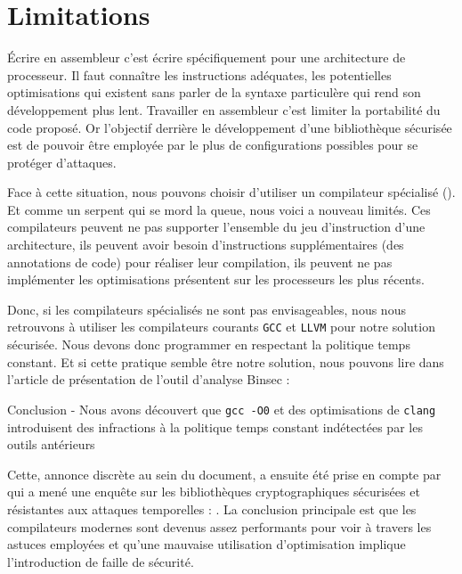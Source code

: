 \section{Limitations}
\label{sect:limitations}

Écrire en assembleur c'est écrire spécifiquement pour une architecture de processeur. Il faut connaître les instructions adéquates, les potentielles optimisations qui existent sans parler de la syntaxe particulère qui rend son développement plus lent. Travailler en assembleur c'est limiter la portabilité du code proposé. Or l'objectif derrière le développement d'une bibliothèque sécurisée est de pouvoir être employée par le plus de configurations possibles pour se protéger d'attaques.\smallbreak

Face à cette situation, nous pouvons choisir d'utiliser un compilateur spécialisé (\cite{Borrello_2021, Raccoon}). Et comme un serpent qui se mord la queue, nous voici a nouveau limités. Ces compilateurs peuvent ne pas supporter l'ensemble du jeu d'instruction d'une architecture, ils peuvent avoir besoin d'instructions supplémentaires (des annotations de code) pour réaliser leur compilation, ils peuvent ne pas implémenter les optimisations présentent sur les processeurs les plus récents.\smallbreak

Donc, si les compilateurs spécialisés ne sont pas envisageables, nous nous retrouvons à utiliser les compilateurs courants \texttt{GCC} et \texttt{LLVM} pour notre solution sécurisée. Nous devons donc programmer en respectant la politique temps constant. Et si cette pratique semble être notre solution, nous pouvons lire dans l'article de présentation de l'outil d'analyse Binsec  : 
\begin{CitationBox}{Conclusion - \cite{binsecRel2019}}
Nous avons découvert que \texttt{gcc -O0} et des optimisations de \texttt{clang} introduisent des infractions à la politique temps constant indétectées par les outils antérieurs
\end{CitationBox}\smallbreak

Cette, annonce discrète au sein du document, a ensuite été prise en compte par \citeauthor{schneider2024breakingbadcompilersbreak} qui a mené une enquête sur les bibliothèques cryptographiques sécurisées et résistantes aux attaques temporelles : \cite{schneider2024breakingbadcompilersbreak}. La conclusion principale est que les compilateurs modernes sont devenus assez performants pour voir à travers les astuces employées et qu'une mauvaise utilisation d'optimisation implique l'introduction de faille de sécurité. \smallbreak

